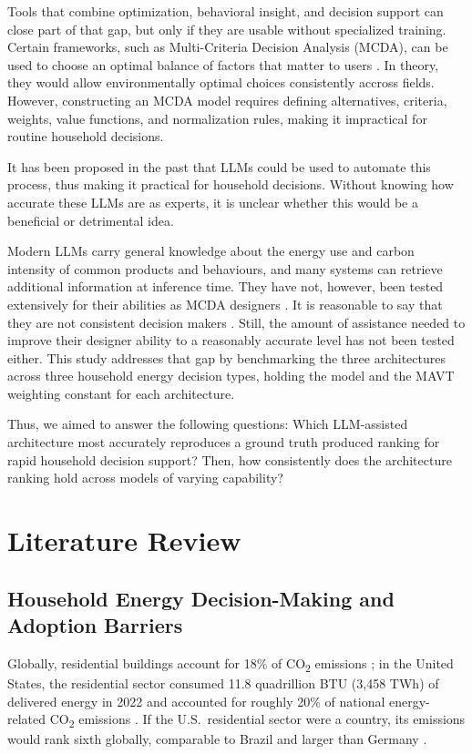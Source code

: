\documentclass[final,3p,times]{elsarticle}
\begin{document}
Tools that combine optimization, behavioral insight, and decision support can close part of that gap, but only if they are usable without specialized training. Certain frameworks, such as Multi-Criteria Decision Analysis (MCDA), can be used to choose an optimal balance of factors that matter to users \cite{huang2011}. In theory, they would allow environmentally optimal choices consistently accross fields. However, constructing an MCDA model requires defining alternatives, criteria, weights, value functions, and normalization rules, making it impractical for routine household decisions.

It has been proposed in the past that LLMs could be used to automate this process, thus making it practical for household decisions. Without knowing how accurate these LLMs are as experts, it is unclear whether this would be a beneficial or detrimental idea.

Modern LLMs carry general knowledge about the energy use and carbon intensity of common products and behaviours, and many systems can retrieve additional information at inference time. They have not, however, been tested extensively for their abilities as MCDA designers \cite{svoboda2024,icaart26}. It is reasonable to say that they are not consistent decision makers \cite{wang2024fairescalers,li2026scoringbias}. Still, the amount of assistance needed to improve their designer ability to a reasonably accurate level has not been tested either. This study addresses that gap by benchmarking the three architectures across three household energy decision types, holding the model and the MAVT weighting constant for each architecture.

Thus, we aimed to answer the following questions: Which LLM-assisted architecture most accurately reproduces a ground truth produced ranking for rapid household decision support?
Then, how consistently does the architecture ranking hold across models of varying capability?

\section{Literature Review}
\label{sec:lit-review}

\subsection{Household Energy Decision-Making and Adoption Barriers}

Globally, residential buildings account for 18\% of CO\textsubscript{2} emissions \cite{GONZALEZTORRES2022112428}; in the United States, the residential sector consumed 11.8 quadrillion BTU (3{,}458 TWh) of delivered energy in 2022 and accounted for roughly 20\% of national energy-related CO\textsubscript{2} emissions \cite{eia2022,goldstein2020}. If the U.S.\ residential sector were a country, its emissions would rank sixth globally, comparable to Brazil and larger than Germany \cite{goldstein2020}.
\end{document}
